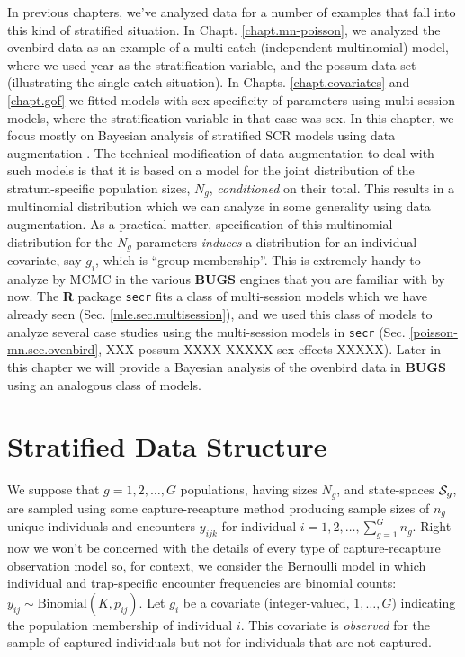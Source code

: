In previous chapters, we've analyzed data for a number of examples
that fall into this kind of stratified situation. In
Chapt. \ref{chapt.mn-poisson}, we analyzed the ovenbird data as an
example of a multi-catch (independent multinomial) model, where we
used year as the stratification variable, and the possum data set
(illustrating the single-catch situation). In
Chapts. \ref{chapt.covariates} and \ref{chapt.gof} we fitted models
with sex-specificity of parameters using multi-session models, where
the stratification variable in that case was sex.  In this chapter, we
focus mostly on Bayesian analysis of stratified SCR models using data
augmentation \citep{royle_etal:2012arXiv,royle_converse:2013}.  The
technical modification of data augmentation to deal with such models
is that it is based on a model for the joint distribution of the
stratum-specific population sizes, $N_{g}$, {\it conditioned} on their
total. This results in a multinomial distribution which we can analyze
in some generality using data augmentation.  As a practical matter,
specification of this multinomial distribution for the $N_{g}$
parameters {\it induces} a distribution for an individual covariate,
say $g_{i}$, which is ``group membership''.  This is extremely handy
to analyze by MCMC in the various {\bf BUGS} engines that you are
familiar with by now.  The {\bf R} package \mbox{\tt secr} fits a
class of multi-session models which we have already seen
(Sec. \ref{mle.sec.multisession}), and we used this class of models to
analyze several case studies using the multi-session models in
\mbox{\tt secr} (Sec. \ref{poisson-mn.sec.ovenbird}, XXX possum XXXX
XXXXX sex-effects XXXXX). Later in this chapter we will provide a
Bayesian analysis of the ovenbird data in {\bf BUGS} using an
analogous class of models.



\section{Stratified Data Structure}


We suppose that $g=1,2,\ldots,G$ populations, having sizes $N_{g}$,
and state-spaces ${\cal S}_{g}$, are sampled using some capture-recapture
method producing sample sizes of $n_{g}$ unique individuals and
encounters $y_{ijk}$ for individual $i=1,2,\ldots, \sum_{g=1}^{G}
n_{g}$.  Right now we won't be concerned with the details of every
type of capture-recapture observation model so, for context, we
consider the Bernoulli model in which individual and trap-specific
encounter frequencies are binomial counts: $y_{ij} \sim
\mbox{Binomial}(K,p_{ij})$.  Let $g_{i}$ be a covariate
(integer-valued, $1, \ldots, G$) indicating the population membership
of individual $i$. This covariate is {\it observed} for the sample of
captured individuals but not for individuals that are not captured.


